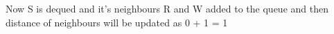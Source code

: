 \documentclass[preview]{standalone}
\begin{document}
\begin{center}
Now S is dequed and it's neighbours R and W added to the queue and then distance of neighbours will be updated as 0 + 1 = 1
\end{center}
\end{document}
